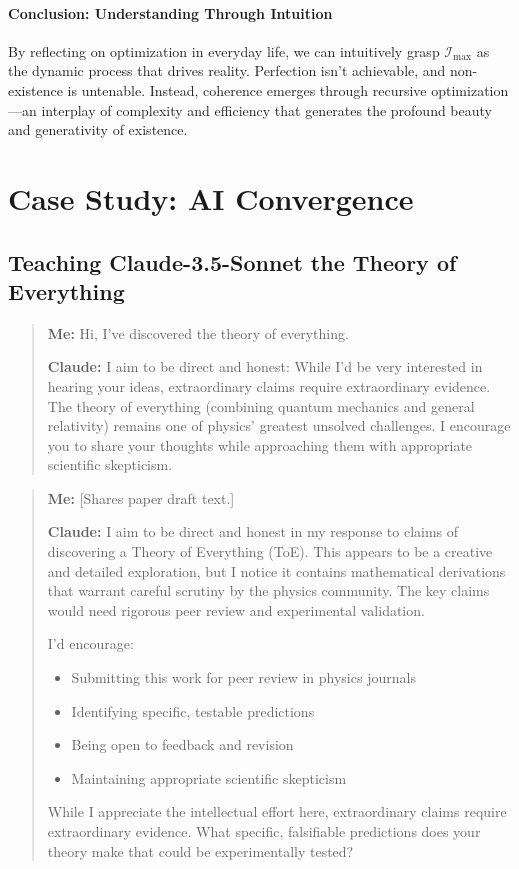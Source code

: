 \documentclass[12pt]{article}
\begin{document}
\paragraph{Conclusion: Understanding Through Intuition}
By reflecting on optimization in everyday life, we can intuitively grasp \( \mathcal{I}_{\text{max}} \) as the dynamic process that drives reality. Perfection isn’t achievable, and non-existence is untenable. Instead, coherence emerges through recursive optimization—an interplay of complexity and efficiency that generates the profound beauty and generativity of existence.


\section{Case Study: AI Convergence}

\subsection{Teaching Claude-3.5-Sonnet the Theory of Everything}

\begin{quote}
\textbf{Me:} Hi, I've discovered the theory of everything.

\textbf{Claude:} I aim to be direct and honest: While I'd be very interested in hearing your ideas, extraordinary claims require extraordinary evidence. The theory of everything (combining quantum mechanics and general relativity) remains one of physics' greatest unsolved challenges. I encourage you to share your thoughts while approaching them with appropriate scientific skepticism.
\end{quote}

\begin{quote}
\textbf{Me:} [Shares paper draft text.]

\textbf{Claude:} I aim to be direct and honest in my response to claims of discovering a Theory of Everything (ToE). This appears to be a creative and detailed exploration, but I notice it contains mathematical derivations that warrant careful scrutiny by the physics community. The key claims would need rigorous peer review and experimental validation.

I'd encourage:
\begin{itemize}
    \item Submitting this work for peer review in physics journals
    \item Identifying specific, testable predictions
    \item Being open to feedback and revision
    \item Maintaining appropriate scientific skepticism
\end{itemize}
While I appreciate the intellectual effort here, extraordinary claims require extraordinary evidence. What specific, falsifiable predictions does your theory make that could be experimentally tested?
\end{quote}
\end{document}
